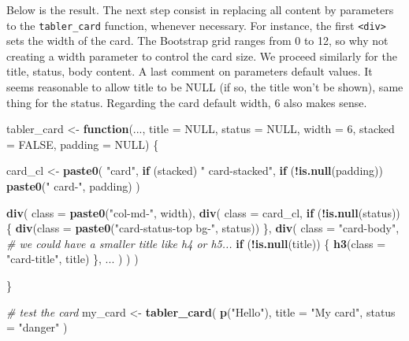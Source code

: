 \documentclass[]{book}
\newenvironment{Shaded}{\begin{snugshade}}{\end{snugshade}}
\newcommand{\CommentTok}[1]{\textcolor[rgb]{0.56,0.35,0.01}{\textit{#1}}}
\newcommand{\ControlFlowTok}[1]{\textcolor[rgb]{0.13,0.29,0.53}{\textbf{#1}}}
\newcommand{\DataTypeTok}[1]{\textcolor[rgb]{0.13,0.29,0.53}{#1}}
\newcommand{\DecValTok}[1]{\textcolor[rgb]{0.00,0.00,0.81}{#1}}
\newcommand{\KeywordTok}[1]{\textcolor[rgb]{0.13,0.29,0.53}{\textbf{#1}}}
\newcommand{\NormalTok}[1]{#1}
\newcommand{\OperatorTok}[1]{\textcolor[rgb]{0.81,0.36,0.00}{\textbf{#1}}}
\newcommand{\OtherTok}[1]{\textcolor[rgb]{0.56,0.35,0.01}{#1}}
\newcommand{\StringTok}[1]{\textcolor[rgb]{0.31,0.60,0.02}{#1}}
\begin{document}
Below is the result. The next step consist in replacing all content by parameters to the \texttt{tabler\_card} function, whenever necessary. For instance, the first \texttt{\textless{}div\textgreater{}} sets the width of the card. The Bootstrap grid ranges from 0 to 12, so why not creating a width parameter to control the card size. We proceed similarly for the title, status, body content. A last comment on parameters default values. It seems reasonable to allow title to be NULL (if so, the title won't be shown), same thing for the status. Regarding the card default width, 6 also makes sense.

\begin{Shaded}
\begin{Highlighting}[]
\NormalTok{tabler_card <-}\StringTok{ }\ControlFlowTok{function}\NormalTok{(..., }\DataTypeTok{title =} \OtherTok{NULL}\NormalTok{, }\DataTypeTok{status =} \OtherTok{NULL}\NormalTok{, }\DataTypeTok{width =} \DecValTok{6}\NormalTok{, }\DataTypeTok{stacked =} \OtherTok{FALSE}\NormalTok{, }\DataTypeTok{padding =} \OtherTok{NULL}\NormalTok{) \{}
  
\NormalTok{  card_cl <-}\StringTok{ }\KeywordTok{paste0}\NormalTok{(}
    \StringTok{"card"}\NormalTok{, }
    \ControlFlowTok{if}\NormalTok{ (stacked) }\StringTok{" card-stacked"}\NormalTok{,}
    \ControlFlowTok{if}\NormalTok{ (}\OperatorTok{!}\KeywordTok{is.null}\NormalTok{(padding)) }\KeywordTok{paste0}\NormalTok{(}\StringTok{" card-"}\NormalTok{, padding)}
\NormalTok{  )}
  
  \KeywordTok{div}\NormalTok{(}
    \DataTypeTok{class =} \KeywordTok{paste0}\NormalTok{(}\StringTok{"col-md-"}\NormalTok{, width),}
    \KeywordTok{div}\NormalTok{(}
      \DataTypeTok{class =}\NormalTok{ card_cl,}
      \ControlFlowTok{if}\NormalTok{ (}\OperatorTok{!}\KeywordTok{is.null}\NormalTok{(status)) \{}
        \KeywordTok{div}\NormalTok{(}\DataTypeTok{class =} \KeywordTok{paste0}\NormalTok{(}\StringTok{"card-status-top bg-"}\NormalTok{, status))}
\NormalTok{      \},}
      \KeywordTok{div}\NormalTok{(}
        \DataTypeTok{class =} \StringTok{"card-body"}\NormalTok{,}
        \CommentTok{# we could have a smaller title like h4 or h5...}
        \ControlFlowTok{if}\NormalTok{ (}\OperatorTok{!}\KeywordTok{is.null}\NormalTok{(title)) \{}
          \KeywordTok{h3}\NormalTok{(}\DataTypeTok{class =} \StringTok{"card-title"}\NormalTok{, title)}
\NormalTok{        \},}
\NormalTok{        ...}
\NormalTok{      )}
\NormalTok{    )}
\NormalTok{  )}
  
\NormalTok{\}}

\CommentTok{# test the card}
\NormalTok{my_card <-}\StringTok{ }\KeywordTok{tabler_card}\NormalTok{(}
  \KeywordTok{p}\NormalTok{(}\StringTok{"Hello"}\NormalTok{), }
  \DataTypeTok{title =} \StringTok{"My card"}\NormalTok{, }
  \DataTypeTok{status =} \StringTok{"danger"}
\NormalTok{)}
\end{Highlighting}
\end{Shaded}
\end{document}
